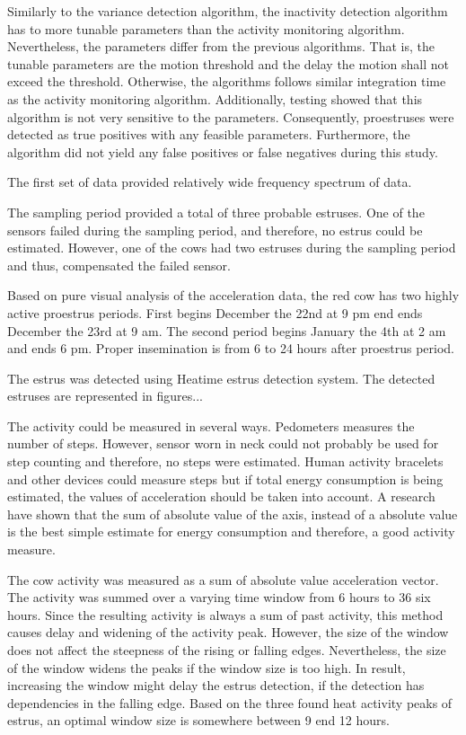 \documentclass[english,12pt,a4paper,pdftex,elec,utf8]{aaltothesis}
\begin{document}
Similarly to the variance detection algorithm, the inactivity detection algorithm has to more tunable parameters than the activity monitoring algorithm. Nevertheless, the parameters differ from the previous algorithms. That is, the tunable parameters are the motion threshold and the delay the motion shall not exceed the threshold. Otherwise, the algorithms follows similar integration time as the activity monitoring algorithm. Additionally, testing showed that this algorithm is not very sensitive to the parameters. Consequently, proestruses were detected as true positives with any feasible parameters. Furthermore, the algorithm did not yield any false positives or false negatives during this study.




The first set of data provided relatively wide frequency spectrum of data.


The sampling period provided a total of three probable estruses. One of the sensors failed during the sampling period, and therefore, no estrus could be estimated. However, one of the cows had two estruses during the sampling period and thus, compensated the failed sensor.

Based on pure visual analysis of the acceleration data, the red cow has two highly active proestrus periods. First begins December the 22nd at 9 pm end ends December the 23rd at 9 am. The second period begins January the 4th at 2 am and ends 6 pm. Proper insemination is from 6 to 24 hours after proestrus period.

The estrus was detected using Heatime estrus detection system. The detected estruses are represented in figures...



The activity could be measured in several ways. Pedometers measures the number of steps. However, sensor worn in neck could not probably be used for step counting and therefore, no steps were estimated. Human activity bracelets and other devices could measure steps but if total energy consumption is being estimated, the values of acceleration should be taken into account. A research have shown that the sum of absolute value of the axis, instead of a absolute value is the best simple estimate for energy consumption and therefore, a good activity measure.

The cow activity was measured as a sum of absolute value acceleration vector. The activity was summed over a varying time window from 6 hours to 36 six hours. Since the resulting activity is always a sum of past activity, this method causes delay and widening of the activity peak. However, the size of the window does not affect the steepness of the rising or falling edges. Nevertheless, the size of the window widens the peaks if the window size is too high. In result, increasing the window might delay the estrus detection, if the detection has dependencies in the falling edge. Based on the three found heat activity peaks of estrus, an optimal window size is somewhere between 9 end 12 hours.
\end{document}
